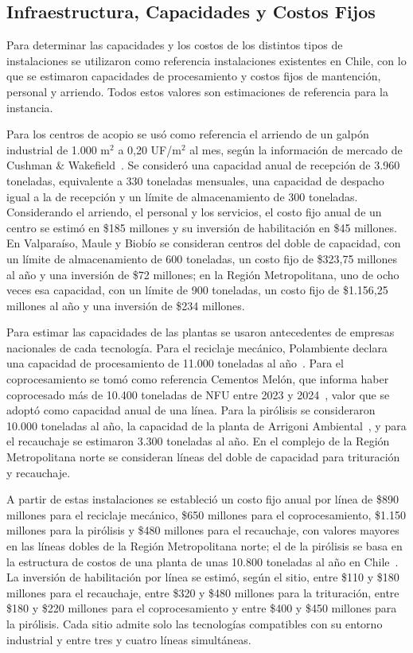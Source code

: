 \documentclass[letterpaper]{article}
\begin{document}
\subsection{Infraestructura, Capacidades y Costos Fijos}

Para determinar las capacidades y los costos de los distintos tipos de instalaciones se utilizaron como referencia instalaciones existentes en Chile, con lo que se estimaron capacidades de procesamiento y costos fijos de mantención, personal y arriendo. Todos estos valores son estimaciones de referencia para la instancia.

Para los centros de acopio se usó como referencia el arriendo de un galpón industrial de 1.000 m$^2$ a 0,20 UF/m$^2$ al mes, según la información de mercado de Cushman \& Wakefield~\cite{bodegas2026}. Se consideró una capacidad anual de recepción de 3.960 toneladas, equivalente a 330 toneladas mensuales, una capacidad de despacho igual a la de recepción y un límite de almacenamiento de 300 toneladas. Considerando el arriendo, el personal y los servicios, el costo fijo anual de un centro se estimó en \$185 millones y su inversión de habilitación en \$45 millones. En Valparaíso, Maule y Biobío se consideran centros del doble de capacidad, con un límite de almacenamiento de 600 toneladas, un costo fijo de \$323,75 millones al año y una inversión de \$72 millones; en la Región Metropolitana, uno de ocho veces esa capacidad, con un límite de 900 toneladas, un costo fijo de \$1.156,25 millones al año y una inversión de \$234 millones.

Para estimar las capacidades de las plantas se usaron antecedentes de empresas nacionales de cada tecnología. Para el reciclaje mecánico, Polambiente declara una capacidad de procesamiento de 11.000 toneladas al año~\cite{polambiente}. Para el coprocesamiento se tomó como referencia Cementos Melón, que informa haber coprocesado más de 10.400 toneladas de NFU entre 2023 y 2024~\cite{melon}, valor que se adoptó como capacidad anual de una línea. Para la pirólisis se consideraron 10.000 toneladas al año, la capacidad de la planta de Arrigoni Ambiental~\cite{arrigoni}, y para el recauchaje se estimaron 3.300 toneladas al año. En el complejo de la Región Metropolitana norte se consideran líneas del doble de capacidad para trituración y recauchaje.

A partir de estas instalaciones se estableció un costo fijo anual por línea de \$890 millones para el reciclaje mecánico, \$650 millones para el coprocesamiento, \$1.150 millones para la pirólisis y \$480 millones para el recauchaje, con valores mayores en las líneas dobles de la Región Metropolitana norte; el de la pirólisis se basa en la estructura de costos de una planta de unas 10.800 toneladas al año en Chile~\cite{rivera2023}. La inversión de habilitación por línea se estimó, según el sitio, entre \$110 y \$180 millones para el recauchaje, entre \$320 y \$480 millones para la trituración, entre \$180 y \$220 millones para el coprocesamiento y entre \$400 y \$450 millones para la pirólisis. Cada sitio admite solo las tecnologías compatibles con su entorno industrial y entre tres y cuatro líneas simultáneas.
\end{document}
